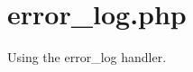 \hypertarget{error_log_8php-example}{
\section{error\_\-log.php}
}
Using the error\_\-log handler.


\begin{DoxyCodeInclude}
\end{DoxyCodeInclude}
 